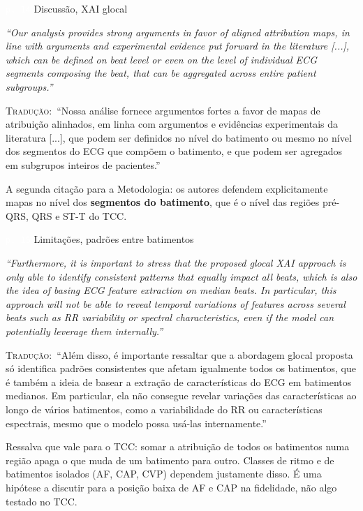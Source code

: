 \documentclass[11pt,a4paper]{article}
\newcommand{\pagechip}[1]{{\setlength{\fboxsep}{1.5pt}\colorbox{cAcc}{\textcolor{white}{\scriptsize\texttt{#1}}}}}
\newenvironment{origquote}{\par\itshape\small}{\par}
\newenvironment{tradquote}{\par\small\textsc{Tradução:}\ }{\par}
\newcommand{\explab}[1]{\par\smallskip{\small\color{cAcc}\textbf{\MakeUppercase{#1}}}\par}
\begin{document}
\begin{citacard}{\pagechip{p. 14} Discussão, XAI glocal}
\begin{origquote}“Our analysis provides strong arguments in favor of aligned attribution maps, in line with arguments and experimental evidence put forward in the literature [...], which can be defined on beat level or even on the level of individual ECG segments composing the beat, that can be aggregated across entire patient subgroups.”\end{origquote}
\begin{tradquote}“Nossa análise fornece argumentos fortes a favor de mapas de atribuição alinhados, em linha com argumentos e evidências experimentais da literatura [...], que podem ser definidos no nível do batimento ou mesmo no nível dos segmentos do ECG que compõem o batimento, e que podem ser agregados em subgrupos inteiros de pacientes.”\end{tradquote}
\explab{Explicação}
A segunda citação para a Metodologia: os autores defendem explicitamente mapas no nível dos \textbf{segmentos do batimento}, que é o nível das regiões pré-QRS, QRS e ST-T do TCC.
\end{citacard}

\begin{citacard}{\pagechip{p. 15} Limitações, padrões entre batimentos}
\begin{origquote}“Furthermore, it is important to stress that the proposed glocal XAI approach is only able to identify consistent patterns that equally impact all beats, which is also the idea of basing ECG feature extraction on median beats. In particular, this approach will not be able to reveal temporal variations of features across several beats such as RR variability or spectral characteristics, even if the model can potentially leverage them internally.”\end{origquote}
\begin{tradquote}“Além disso, é importante ressaltar que a abordagem glocal proposta só identifica padrões consistentes que afetam igualmente todos os batimentos, que é também a ideia de basear a extração de características do ECG em batimentos medianos. Em particular, ela não consegue revelar variações das características ao longo de vários batimentos, como a variabilidade do RR ou características espectrais, mesmo que o modelo possa usá-las internamente.”\end{tradquote}
\explab{Explicação}
Ressalva que vale para o TCC: somar a atribuição de todos os batimentos numa região apaga o que muda de um batimento para outro. Classes de ritmo e de batimentos isolados (AF, CAP, CVP) dependem justamente disso. É uma hipótese a discutir para a posição baixa de AF e CAP na fidelidade, não algo testado no TCC.
\end{citacard}
\end{document}
